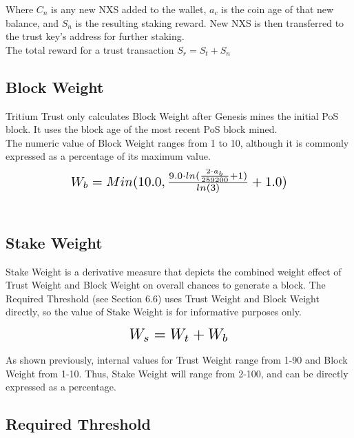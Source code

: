 \documentclass[11pt]{article}
\begin{document}
\noindent Where $C_{n}$ is any new NXS added to the wallet, $a_c$ is the coin age of that new balance, and $S_{n}$ is the resulting staking reward. New NXS is then transferred to the trust key's address for further staking.\\

\noindent The total reward for a trust transaction $S_{r} = S_{t} + S_{n}$\\


\subsection{Block Weight}
Tritium Trust only calculates Block Weight after Genesis mines the initial PoS block. It uses the block age of the most recent PoS block mined. \\

\noindent The numeric value of Block Weight ranges from 1 to 10, although it is commonly expressed as a percentage of its maximum value.\\

\begin{equation}
\resizebox{.65\hsize}{!}{$W_{b} = Min(10.0, \frac{9.0 \cdot ln(\frac{2 \cdot a_{b}}{259200} + 1)}{ln(3)} + 1.0)$}
\end{equation}\\


\subsection{Stake Weight}
Stake Weight is a derivative measure that depicts the combined weight effect of Trust Weight and Block Weight on overall chances to generate a block. The Required Threshold (see Section 6.6) uses Trust Weight and Block Weight directly, so the value of Stake Weight is for informative purposes only.

\begin{equation}
\resizebox{.30\hsize}{!}{$W_{s} = W_{t} + W_{b}$}
\end{equation} 

\noindent As shown previously, internal values for Trust Weight range from 1-90 and Block Weight from 1-10. Thus, Stake Weight will range from 2-100, and can be directly expressed as a percentage.\\


\subsection{Required Threshold}
\end{document}
